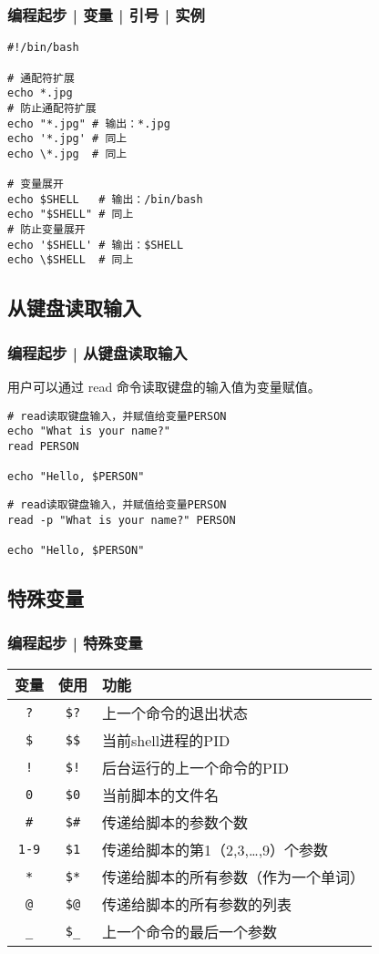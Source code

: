 \begin{frame}[fragile]
  \frametitle{编程起步 | 变量 | 引号 | \alert{实例}}
\begin{lstlisting}
#!/bin/bash

# 通配符扩展
echo *.jpg
# 防止通配符扩展
echo "*.jpg" # 输出：*.jpg
echo '*.jpg' # 同上
echo \*.jpg  # 同上

# 变量展开
echo $SHELL   # 输出：/bin/bash
echo "$SHELL" # 同上
# 防止变量展开
echo '$SHELL' # 输出：$SHELL
echo \$SHELL  # 同上
\end{lstlisting}
\end{frame}


\subsection{从键盘读取输入}
\begin{frame}[fragile]
  \frametitle{编程起步 | 从键盘读取输入}
  用户可以通过 \alert{read} 命令读取键盘的输入值为变量赋值。
\begin{lstlisting}
# read读取键盘输入，并赋值给变量PERSON
echo "What is your name?"
read PERSON

echo "Hello, $PERSON"
\end{lstlisting}
\pause
\begin{lstlisting}
# read读取键盘输入，并赋值给变量PERSON
read -p "What is your name?" PERSON

echo "Hello, $PERSON"
\end{lstlisting}
\end{frame}

\subsection{特殊变量}
\begin{frame}[fragile]
  \frametitle{编程起步 | \alert{特殊变量}}
  \begin{table}
    \centering
    \begin{tabularx}{0.8\textwidth}{ccX}
      \hline
      \rowcolor{blue!50}变量 & 使用 & 功能\\
      \hline
      \verb|?| & \verb|$?| & 上一个命令的退出状态\\
      \verb|$| & \verb|$$| & 当前shell进程的PID\\
      \verb|!| & \verb|$!| & 后台运行的上一个命令的PID\\
      \verb|0| & \verb|$0| & 当前脚本的文件名\\
      \verb|#| & \verb|$#| & 传递给脚本的参数个数\\
      \verb|1-9| & \verb|$1| & 传递给脚本的第1（2,3,\ldots,9）个参数\\
      \verb|*| & \verb|$*| & 传递给脚本的所有参数（作为一个单词）\\
      \verb|@| & \verb|$@| & 传递给脚本的所有参数的列表\\
      \verb|_| & \verb|$_| & 上一个命令的最后一个参数\\
      \hline
    \end{tabularx}
  \end{table}
\end{frame}

